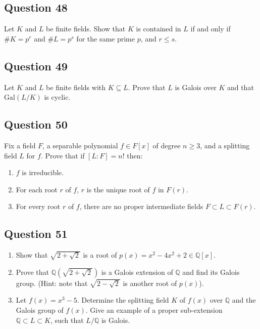 \documentclass[12pt]{article}
\begin{document}
\hypertarget{question-48}{%
\subsection{Question 48}\label{question-48}}

Let \(K\) and \(L\) be finite fields. Show that \(K\) is contained in
\(L\) if and only if \(\# K = p^r\) and \(\# L = p^s\) for the same
prime \(p\), and \(r \leq s\).

\hypertarget{question-49}{%
\subsection{Question 49}\label{question-49}}

Let \(K\) and \(L\) be finite fields with \(K \subseteq L\). Prove that
\(L\) is Galois over \(K\) and that \(\mathrm{Gal}(L/K)\) is cyclic.

\hypertarget{question-50}{%
\subsection{Question 50}\label{question-50}}

Fix a field \(F\), a separable polynomial \(f\in F[x]\) of degree
\(n \geq 3\), and a splitting field \(L\) for \(f\). Prove that if
\([L:F] = n!\) then:

\begin{enumerate}
\def\labelenumi{\arabic{enumi}.}
\item
  \(f\) is irreducible.
\item
  For each root \(r\) of \(f\), \(r\) is the unique root of \(f\) in
  \(F(r)\).
\item
  For every root \(r\) of \(f\), there are no proper intermediate fields
  \(F \subset L \subset F(r)\).
\end{enumerate}

\hypertarget{question-51}{%
\subsection{Question 51}\label{question-51}}

\begin{enumerate}
\def\labelenumi{\arabic{enumi}.}
\item
  Show that \(\sqrt{2+\sqrt{2}}\) is a root of
  \(p(x) = x^2 - 4x^2 + 2 \in \mathbb{Q}[x]\).
\item
  Prove that \(\mathbb{Q}(\sqrt{2 + \sqrt{2}})\) is a Galois extension
  of \(\mathbb{Q}\) and find its Galois group. (Hint: note that
  \(\sqrt{2 - \sqrt{2}}\) is another root of \(p(x)\)).
\item
  Let \(f(x) = x^3 - 5\). Determine the splitting field \(K\) of
  \(f(x)\) over \(\mathbb{Q}\) and the Galois group of \(f(x)\). Give an
  example of a proper sub-extension \(\mathbb{Q} \subset L \subset K\),
  such that \(L/\mathbb{Q}\) is Galois.
\end{enumerate}
\end{document}
